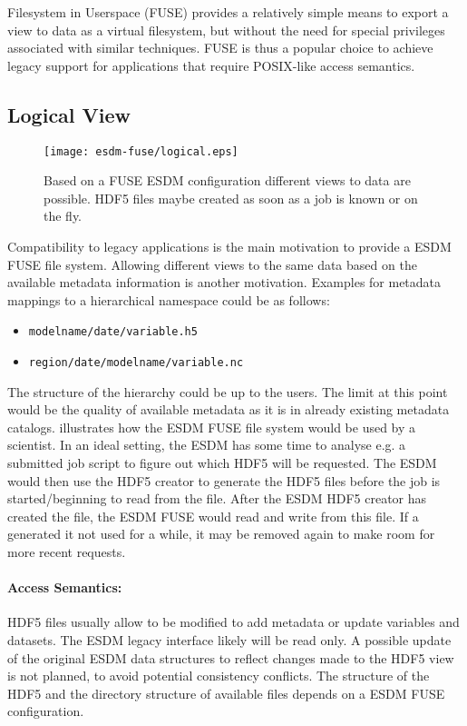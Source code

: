 
Filesystem in Userspace (FUSE) provides a relatively simple means to export a view to data as a virtual filesystem, but without the need for special privileges associated with similar techniques. FUSE is thus a popular choice to achieve legacy support for applications that require POSIX-like access semantics.


\subsection{Logical View}

\begin{figure}
	\centering
	\texttt{[image: esdm-fuse/logical.eps]}
	\caption{Based on a FUSE ESDM configuration different views to data are possible. HDF5 files maybe created as soon as a job is known or on the fly.}
	\label{fig:esdm fuse logical view}
\end{figure}

Compatibility to legacy applications is the main motivation to provide a ESDM FUSE  file system.
Allowing different views to the same data based on the available metadata information is another motivation.
Examples for  metadata mappings to a hierarchical namespace could be as follows:

\begin{itemize}
	\item  \texttt{modelname/date/variable.h5}
	\item  \texttt{region/date/modelname/variable.nc}
\end{itemize}

The structure of the hierarchy could be up to the users.
The limit at this point would be the quality of available metadata as it is in already existing metadata catalogs.
 illustrates how the ESDM FUSE file system would be used by a scientist.
In an ideal setting, the ESDM has some time to analyse e.g. a submitted job script to figure out which HDF5 will be requested.
The ESDM would then use the HDF5 creator to generate the HDF5 files before the job is started/beginning to read from the file.
After the ESDM HDF5 creator has created the file, the ESDM FUSE would read and write from this file.
If a generated it not used for a while, it may be removed again to make room for more recent requests.


\paragraph{Access Semantics:}
HDF5 files usually allow to be modified to add metadata or update variables and datasets.
The ESDM legacy interface likely will be read only.
A possible update of the original ESDM data structures to reflect changes made to the HDF5 view is not planned, to avoid potential consistency conflicts.
The structure of the HDF5 and the directory structure of available files depends on a ESDM FUSE configuration.



